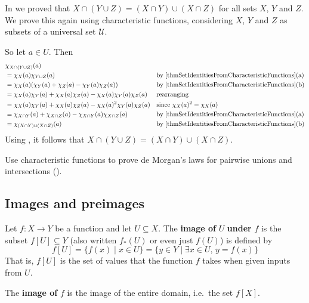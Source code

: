 \begin{example}
In  we proved that $X \cap (Y \cup Z) = (X \cap Y) \cup (X \cap Z)$ for all sets $X$, $Y$ and $Z$. We prove this again using characteristic functions, considering $X$, $Y$ and $Z$ as subsets of a universal set $\mathcal{U}$.

So let $a \in U$. Then
\begin{align*}
& \chi_{X \cap (Y \cup Z)}(a) && \\
&= \chi_X(a) \chi_{Y \cup Z}(a) && \text{by \Cref{thmSetIdentitiesFromCharacteristicFunctions}(a)} \\
&= \chi_X(a) (\chi_Y(a) + \chi_Z(a) - \chi_Y(a)\chi_Z(a)) && \text{by \Cref{thmSetIdentitiesFromCharacteristicFunctions}(b)} \\
&= \chi_X(a)\chi_Y(a) + \chi_X(a)\chi_Z(a) - \chi_X(a)\chi_Y(a)\chi_Z(a) && \text{rearranging} \\
&= \chi_X(a)\chi_Y(a) + \chi_X(a)\chi_Z(a) - \chi_X(a)^2\chi_Y(a)\chi_Z(a) && \text{since $\chi_X(a)^2=\chi_X(a)$} \\
&= \chi_{X \cap Y}(a) + \chi_{X \cap Z}(a) - \chi_{X \cap Y}(a) \chi_{X \cap Z}(a) && \text{by \Cref{thmSetIdentitiesFromCharacteristicFunctions}(a)} \\
&= \chi_{(X \cap Y) \cup (X \cap Z)}(a) && \text{by \Cref{thmSetIdentitiesFromCharacteristicFunctions}(b)}
\end{align*}
Using , it follows that $X \cap (Y \cup Z) = (X \cap Y) \cup (X \cap Z)$.
\end{example}

\begin{exercise}
Use characteristic functions to prove de Morgan's laws for pairwise unions and intersections ().
\end{exercise}

\subsection*{Images and preimages}

\begin{definition}
\label{defImage}
Let $f : X \to Y$ be a function and let $U \subseteq X$. The \textbf{image of} $U$ \textbf{under} $f$ is the subset $f[U] \subseteq Y$ (also written $f_*(U)$  or even just $f(U)$) is defined by
\[ f[U] = \{ f(x) \mid x \in U \} = \{ y \in Y \mid \exists x \in U,\, y = f(x) \} \]
That is, $f[U]$ is the set of values that the function $f$ takes when given inputs from $U$.

The \textbf{image of} $f$ is the image of the entire domain, i.e.\ the set $f[X]$.
\end{definition}

